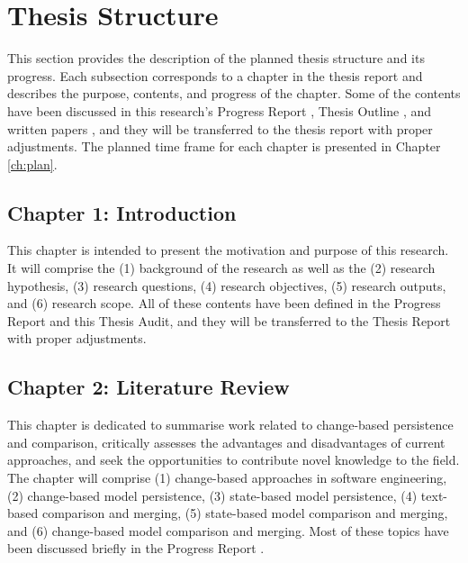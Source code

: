 \documentclass[12pt, a4paper]{report} \usepackage[titletoc]{appendix}
\begin{document}
\chapter{Thesis Structure}
\label{sec:Thesis Structure}
This section provides the description of the planned thesis structure and its progress. Each subsection corresponds to a chapter in the thesis report and describes the purpose, contents, and progress of the chapter. Some of the contents have been discussed in this research's Progress Report \cite{yohannis2017progress}, Thesis Outline \cite{yohannis2018outline}, and written papers \cite{DBLP:conf/models/YohannisKP17,yohannis2018towards,DBLP:conf/models/YohannisRPK18}, and they will be transferred to the thesis report with proper adjustments. The planned time frame for each chapter is presented in Chapter \ref{ch:plan}.

\section{Chapter 1: Introduction}
\label{sec:chapter_1_introduction_plan}
This chapter is intended to present the motivation and purpose of this research. It will comprise the (1) background of the research as well as the (2) research hypothesis, (3) research questions, (4) research objectives, (5) research outputs, and (6) research scope. All of these contents have been defined in the Progress Report \cite{yohannis2017progress} and  this Thesis Audit, and they will be transferred to the Thesis Report with proper adjustments. 

\section{Chapter 2: Literature Review}
\label{sec:chapter_2_literature_review_plan}
This chapter is dedicated to summarise work related to change-based persistence and comparison, critically assesses the advantages and disadvantages of current approaches, and seek the opportunities to contribute novel knowledge to the field. The chapter will comprise (1) change-based approaches in software engineering, (2) change-based model persistence, (3) state-based model persistence, (4) text-based comparison and merging, (5) state-based model comparison and merging, and (6) change-based model comparison and merging. Most of these topics have been discussed briefly in the Progress Report \cite{yohannis2017progress}. %
\end{document}
